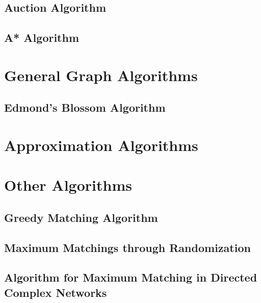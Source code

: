 \documentclass[condensed]{union-cs-thesis}
\begin{document}
\subsection{Auction Algorithm}
\label{subsec:auction}


\subsection{A* Algorithm}
\label{subsec:A_star}


\section{General Graph Algorithms}
\label{sec:general_graph_algorithms}

\subsection{Edmond's Blossom Algorithm}
\label{subsec:edmonds_blossom}


\section{Approximation Algorithms}
\label{sec:approximation_algorithms}


\section{Other Algorithms}
\label{sec:other_algorithms}

\subsection{Greedy Matching Algorithm}
\label{subsec:greedy_matching}


\subsection{Maximum Matchings through Randomization}
\label{subsec:randomization}


\subsection{Algorithm for Maximum Matching in Directed Complex Networks}
\label{subsec:directed_complex}

\end{document}
